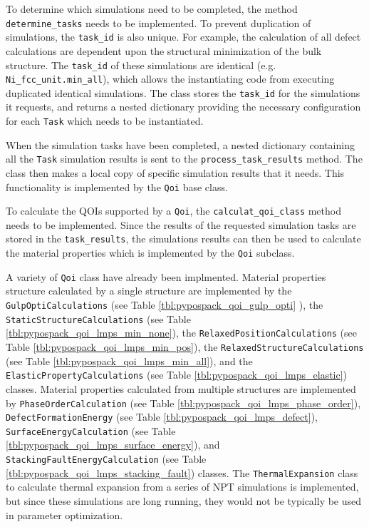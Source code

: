 To determine which simulations need to be completed, the method \verb|determine_tasks| needs to be implemented.  To prevent duplication of simulations, the \verb|task_id| is also unique.  For example, the calculation of all defect calculations are dependent upon the structural minimization of the bulk structure.  The \verb|task_id| of these simulations are identical (e.g. \verb|Ni_fcc_unit.min_all|), which allows the instantiating code from executing duplicated identical simulations.  The class stores the \verb|task_id| for the simulations it requests, and returns a nested dictionary providing the necessary configuration for each \verb|Task| which needs to be instantiated.

When the simulation tasks have been completed, a nested dictionary containing all the \verb|Task| simulation results is sent to the \verb|process_task_results| method.  The class then makes a local copy of specific simulation results that it needs.  This functionality is implemented by the \verb|Qoi| base class.

To calculate the QOIs supported by a \verb|Qoi|, the \verb|calculat_qoi_class| method needs to be implemented.  Since the results of the requested simulation tasks are stored in the \verb|task_results|, the simulations results can then be used to calculate the material properties which is implemented by the \verb|Qoi| subclass.

A variety of \verb|Qoi| class have already been implmented.  Material properties structure calculated by a single structure are implemented by
the \verb|GulpOptiCalculations|
    (see Table \ref{tbl:pypospack_qoi_gulp_opti} ),
the \verb|StaticStructureCalculations|
    (see Table \ref{tbl:pypospack_qoi_lmps_min_none}),
the \verb|RelaxedPositionCalculations|
    (see Table \ref{tbl:pypospack_qoi_lmps_min_pos}),
the \verb|RelaxedStructureCalculations|
    (see Table \ref{tbl:pypospack_qoi_lmps_min_all}),
and the \verb|ElasticPropertyCalculations|
    (see Table \ref{tbl:pypospack_qoi_lmps_elastic})
		classes.
Material properties calculated from multiple structures are implemented by
\verb|PhaseOrderCalculation|
    (see Table \ref{tbl:pypospack_qoi_lmps_phase_order}),
\verb|DefectFormationEnergy|
    (see Table \ref{tbl:pypospack_qoi_lmps_defect}),
\verb|SurfaceEnergyCalculation|
    (see Table \ref{tbl:pypospack_qoi_lmps_surface_energy}), and
\verb|StackingFaultEnergyCalculation|
    (see Table
		    \ref{tbl:pypospack_qoi_lmps_stacking_fault}) classes.
The \verb|ThermalExpansion| class to calculate thermal expansion from a series of NPT simulations is implemented, but since these simulations are long running, they would not be typically be used in parameter optimization.

